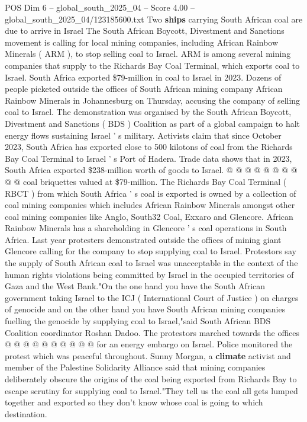 \begin{textsample}{POS Dim 6 – global\_south\_2025\_04 – Score 4.00 – global\_south\_2025\_04/123185600.txt}  \label{ex:f6_pos_237}
Two \textbf{ships} carrying South African coal are due to arrive in Israel The South African Boycott, Divestment and Sanctions movement is calling for local mining companies, including African Rainbow Minerals ( ARM ), to stop selling coal to Israel.
ARM is among several mining companies that supply to the Richards Bay Coal Terminal, which exports coal to Israel.
South Africa exported \$79-million in coal to Israel in 2023.
Dozens of people picketed outside the offices of South African mining company African Rainbow Minerals in Johannesburg on Thursday, accusing the company of selling coal to Israel.
The demonstration was organised by the South African Boycott, Divestment and Sanctions ( BDS ) Coalition as part of a global campaign to halt energy flows sustaining Israel ' s military.
Activists claim that since October 2023, South Africa has exported close to 500 kilotons of coal from the Richards Bay Coal Terminal to Israel ' s Port of Hadera.
Trade data shows that in 2023, South Africa exported \$238-million worth of goods to Israel. @ @ @ @ @ @ @ @ @ @ coal briquettes valued at \$79-million.
The Richards Bay Coal Terminal ( RBCT ) from which South Africa ' s coal is exported is owned by a collection of coal mining companies which includes African Rainbow Minerals amongst other coal mining companies like Anglo, South32 Coal, Exxaro and Glencore.
African Rainbow Minerals has a shareholding in Glencore ' s coal operations in South Africa.
Last year protesters demonstrated outside the offices of mining giant Glencore calling for the company to stop supplying coal to Israel.
Protestors say the supply of South African coal to Israel was unacceptable in the context of the human rights violations being committed by Israel in the occupied territories of Gaza and the West Bank."On the one hand you have the South African government taking Israel to the ICJ ( International Court of Justice ) on charges of genocide and on the other hand you have South African mining companies fuelling the genocide by supplying coal to Israel,"said South African BDS Coalition coordinator Roshan Dadoo.
The protestors marched towards the offices @ @ @ @ @ @ @ @ @ @ for an energy embargo on Israel.
Police monitored the protest which was peaceful throughout.
Sunny Morgan, a \textbf{climate} activist and member of the Palestine Solidarity Alliance said that mining companies deliberately obscure the origins of the coal being exported from Richards Bay to escape scrutiny for supplying coal to Israel."They tell us the coal all gets lumped together and exported so they don't know whose coal is going to which destination.

\end{textsample}
